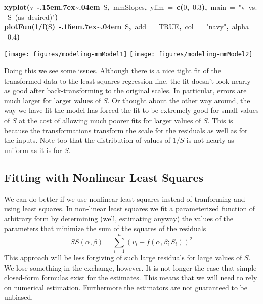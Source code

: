 \documentclass{article}\usepackage{graphicx, color}
\makeatletter
\newcommand{\hlnumber}[1]{\textcolor[rgb]{0,0,0}{#1}}%
\newcommand{\hlfunctioncall}[1]{\textcolor[rgb]{0.501960784313725,0,0.329411764705882}{\textbf{#1}}}%
\newcommand{\hlstring}[1]{\textcolor[rgb]{0.6,0.6,1}{#1}}%
\newcommand{\hlkeyword}[1]{\textcolor[rgb]{0,0,0}{\textbf{#1}}}%
\newcommand{\hlargument}[1]{\textcolor[rgb]{0.690196078431373,0.250980392156863,0.0196078431372549}{#1}}%
\newcommand{\hlsymbol}[1]{\textcolor[rgb]{0,0,0}{#1}}%
\def\urltilda{\kern -.15em\lower .7ex\hbox{\~{}}\kern .04em}%
\newcommand{\hlstd}[1]{\textcolor[rgb]{0,0,0}{#1}}%
\newenvironment{kframe}{%
 \def\FrameCommand##1{\hskip\@totalleftmargin \hskip-\fboxsep
 \colorbox{shadecolor}{##1}\hskip-\fboxsep
     \hskip-\linewidth \hskip-\@totalleftmargin \hskip\columnwidth}%
 \MakeFramed {\advance\hsize-\width
   \@totalleftmargin\z@ \linewidth\hsize
   \@setminipage}}%
 {\par\unskip\endMakeFramed}
\newenvironment{knitrout}{}{} %
\makeatother
\begin{document}
\begin{knitrout}
\begin{kframe}
\begin{flushleft}
\hlstd{}\hlfunctioncall{xyplot}\hlkeyword{(}\hlsymbol{v}{\ }\hlkeyword{\urltilda{}}{\ }\hlsymbol{S}\hlkeyword{,}{\ }\hlsymbol{mmSlopes}\hlkeyword{,}{\ }\hlargument{ylim}{\ }\hlargument{=}{\ }\hlfunctioncall{c}\hlkeyword{(}\hlnumber{0}\hlkeyword{,}{\ }\hlnumber{0.3}\hlkeyword{)}\hlkeyword{,}{\ }\hlargument{main}{\ }\hlargument{=}{\ }\hlstring{"{}{}v{\ }vs.{\ }S{\ }(as{\ }desired)"{}{}}\hlkeyword{)}\hspace*{\fill}\\
\hlstd{}\hlfunctioncall{plotFun}\hlkeyword{(}\hlnumber{1}\hlkeyword{/}\hlfunctioncall{f}\hlkeyword{(}\hlsymbol{S}\hlkeyword{)}{\ }\hlkeyword{\urltilda{}}{\ }\hlsymbol{S}\hlkeyword{,}{\ }\hlargument{add}{\ }\hlargument{=}{\ }\hlnumber{TRUE}\hlkeyword{,}{\ }\hlargument{col}{\ }\hlargument{=}{\ }\hlstring{"{}{}navy"{}{}}\hlkeyword{,}{\ }\hlargument{alpha}{\ }\hlargument{=}{\ }\hlnumber{0.4}\hlkeyword{)}\mbox{}
\normalfont
\end{flushleft}
\end{kframe}

{\centering \texttt{[image: figures/modeling-mmModel1]} \texttt{[image: figures/modeling-mmModel2]} 

}


\end{knitrout}


Doing this we see some issues.  Although there is a nice tight fit of the transformed 
data to the least squares regression line, the fit doesn't look nearly as good after 
back-transforming to the original scales.  In particular, errors are much larger for larger
values of $S$.  Or thought about the other way around, the way we have fit the model 
has forced the fit to be extremely good for small values of $S$ at the cost of allowing
much poorer fits for larger values of $S$.  This is because the transformations
transform the scale for the residuals as well as for the inputs.  Note too that the distribution of values of $1/S$ is not nearly as uniform as it is for $S$.

\subsection{Fitting with Nonlinear Least Squares}
We can do better if we use nonlinear least squares instead of tranforming and using least
squares.  In non-linear least squares we fit a parameterized function of arbitrary form
by determining (well, estimating anyway) the values of the parameters that 
minimize the sum of the squares of the residuals
\[
SS(\alpha, \beta) = \sum_{i=1}^n ( v_i - f(\alpha, \beta; S_i) )^2
\]
This approach will be less forgiving of such large residuals for large values of $S$.
We lose something in the exchange, however.  It is not longer the case that simple
closed-form formulas exist for the estimates.  This means that we will need to rely
on numerical estimation.  
Furthermore the estimators are not guaranteed to be
unbiased.
\end{document}
